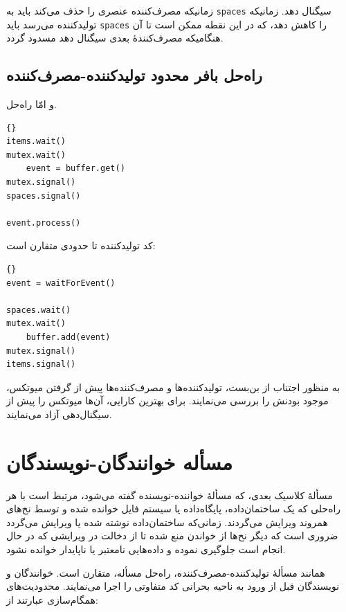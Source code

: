 \documentclass{book}
\newcommand{\clearemptydoublepage}{}%
\begin{document}
    زمانیکه مصرف‌کننده عنصری را حذف می‌کند باید به {\tt spaces} سیگنال دهد. 
    زمانیکه تولیدکننده می‌رسد باید {\tt spaces} را کاهش دهد، که در این نقطه ممکن است تا آن هنگامیکه مصرف‌کنندهٔ بعدی سیگنال دهد مسدود گردد. 


\clearemptydoublepage
\subsection{ راه‌حل بافر محدود تولیدکننده-مصرف‌کننده }

    و امّا راه‌حل. 

\begin{latin}
\begin{lstlisting}[title=\rl{راه‌حل  بافر محدود  مصرف‌کننده}]{}
items.wait()
mutex.wait()
    event = buffer.get()
mutex.signal()
spaces.signal()

event.process()
\end{lstlisting}
\end{latin}

    کد تولیدکننده  تا حدودی متقارن است: 

\begin{latin}
\begin{lstlisting}[title=\rl{راه‌حل  بافر محدود تولیدکننده}]{}
event = waitForEvent()

spaces.wait()
mutex.wait()
    buffer.add(event)
mutex.signal()
items.signal()
\end{lstlisting}
\end{latin}

    به منظور اجتناب از بن‌بست، تولیدکننده‌ها و مصرف‌کننده‌ها پیش از گرفتن میوتکس، موجود بودنش را بررسی می‌نمایند. 
    برای بهترین کارایی، آن‌ها میوتکس را پیش از سیگنال‌دهی آزاد می‌نمایند. 


\section{مسأله خوانندگان-نویسندگان}

    مسألهٔ کلاسیک بعدی، که مسألهٔ خواننده-نویسنده گفته می‌شود، مرتبط است با هر راه‌حلی که یک ساختمان‌داده، پایگاه‌داده یا سیستم فایل 
    خوانده شده و توسط نخ‌های همروند ویرایش می‌گردند. زمانی‌که ساختمان‌داده نوشته شده یا ویرایش می‌گردد ضروری است که دیگر نخ‌ها
    از خواندن منع شده تا از دخالت در ویرایشی که در حال انجام است جلوگیری نموده و داده‌هایی نامعتبر یا ناپایدار خوانده نشود. 

    همانند مسألهٔ تولیدکننده‌-مصرف‌کننده،‌ راه‌حل مسأله، متقارن است. 
    خوانندگان و نویسندگان قبل از ورود به ناحیه بحرانی کد متفاوتی را اجرا می‌نمایند. محدودیت‌های همگام‌سازی عبارتند از: 
\end{document}
